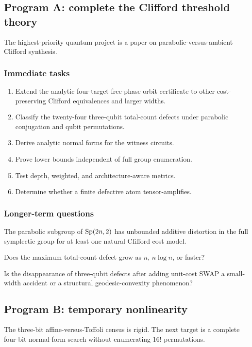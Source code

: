\subsection{Program A: complete the Clifford threshold theory}
The highest-priority quantum project is a paper on parabolic-versus-ambient Clifford synthesis.

\subsubsection{Immediate tasks}
\begin{enumerate}
\item Extend the analytic four-target free-phase orbit certificate to other cost-preserving Clifford equivalences and larger widths.
\item Classify the twenty-four three-qubit total-count defects under parabolic conjugation and qubit permutations.
\item Derive analytic normal forms for the witness circuits.
\item Prove lower bounds independent of full group enumeration.
\item Test depth, weighted, and architecture-aware metrics.
\item Determine whether a finite defective atom tensor-amplifies.
\end{enumerate}

\subsubsection{Longer-term questions}
\begin{conjecture}
The parabolic subgroup of $\operatorname{Sp}(2n,2)$ has unbounded additive distortion in the full symplectic group for at least one natural Clifford cost model.
\end{conjecture}
\begin{question}
Does the maximum total-count defect grow as $n$, $n\log n$, or faster?
\end{question}
\begin{question}
Is the disappearance of three-qubit defects after adding unit-cost SWAP a small-width accident or a structural geodesic-convexity phenomenon?
\end{question}

\subsection{Program B: temporary nonlinearity}
The three-bit affine-versus-Toffoli census is rigid.  The next target is a complete four-bit normal-form search without enumerating $16!$ permutations.

